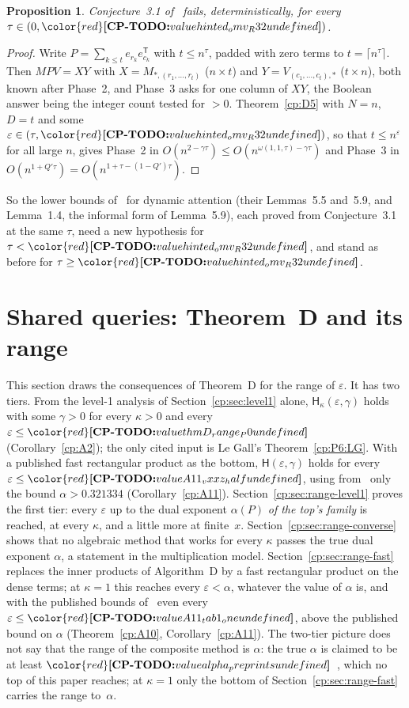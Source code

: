 \documentclass[11pt]{article}
\makeatletter
\newtheorem{proposition}[theorem]{Proposition}
\theoremstyle{definition}
\theoremstyle{remark}
\DeclareRobustCommand{\CPTODO}[1]{{\color{red}\textbf{[CP-TODO:} #1\textbf{]}}}
\providecommand{\eps}{\varepsilon}
\newcommand{\Hyp}{\mathsf{H}}                 %
\newcommand{\Hypk}[1]{\mathsf{H}_{#1}}        %
\newcommand{\ThmD}{Theorem~D}                               %
\newcommand{\AlgD}{Algorithm~D}                             %
\newcommand{\cpv}[1]{\ifcsname cpv@#1\endcsname\csname cpv@#1\endcsname\else\CPTODO{value #1 undefined}\fi}
\newcommand{\AlphaVXXZ}{0.321334}%
\makeatother
\begin{document}
\begin{proposition}\label{cp:D:BSZ}
Conjecture~3.1 of~\cite{BSZ24} fails, deterministically, for every $\tau\in(0,\cpv{hinted_omv_R32})$.
\end{proposition}

\begin{proof}
Write $P=\sum_{k\le t}e_{r_k}e_{c_k}^{\mathsf T}$ with $t\le n^\tau$, padded with zero terms to $t=\lceil n^\tau\rceil$. Then $MPV=XY$ with $X=M_{*,(r_1,\dots,r_t)}$ ($n\times t$) and $Y=V_{(c_1,\dots,c_t),*}$ ($t\times n$), both known after Phase~2, and Phase~3 asks for one column of $XY$, the Boolean answer being the integer count tested for $>0$. Theorem~\ref{cp:D5} with $N=n$, $D=t$ and some $\eps\in(\tau,\cpv{hinted_omv_R32})$, so that $t\le n^\eps$ for all large $n$, gives Phase~2 in $O(n^{2-\gamma\tau})\le O(n^{\omega(1,1,\tau)-\gamma\tau})$ and Phase~3 in $O(n^{1+Q'\tau})=O(n^{1+\tau-(1-Q')\tau})$.
\end{proof}

So the lower bounds of~\cite{BSZ24} for dynamic attention (their Lemmas~5.5 and~5.9, and Lemma~1.4, the informal form of Lemma~5.9), each proved from Conjecture~3.1 at the same $\tau$, need a new hypothesis for $\tau<\cpv{hinted_omv_R32}$, and stand as before for $\tau\ge\cpv{hinted_omv_R32}$.

\section{Shared queries: \texorpdfstring{\ThmD}{Theorem D} and its range}\label{cp:sec:range}

This section draws the consequences of \ThmD{} for the range of $\eps$. It has two tiers.
From the level-1 analysis of Section~\ref{cp:sec:level1} alone, $\Hypk\kappa(\eps,\gamma)$ holds with some $\gamma>0$ for every $\kappa>0$ and every $\eps\le\cpv{thmD_range_P0}$ (Corollary~\ref{cp:A2}); the only cited input is Le Gall's Theorem~\ref{cp:P6:LG}. With a published fast rectangular product as the bottom, $\Hyp(\eps,\gamma)$ holds for every $\eps\le\cpv{A11_vxxz_half}$, using from~\cite{VXXZ24} only the bound $\alpha>\AlphaVXXZ$ (Corollary~\ref{cp:A11}).
Section~\ref{cp:sec:range-level1} proves the first tier: every $\eps$ up to the dual exponent $\alpha(P)$ \emph{of the top's family} is reached, at every $\kappa$, and a little more at finite~$x$. Section~\ref{cp:sec:range-converse} shows that no algebraic method that works for every $\kappa$ passes the true dual exponent $\alpha$, a statement in the multiplication model. Section~\ref{cp:sec:range-fast} replaces the inner products of \AlgD{} by a fast rectangular product on the dense terms; at $\kappa=1$ this reaches every $\eps<\alpha$, whatever the value of $\alpha$ is, and with the published bounds of~\cite{VXXZ24} even every $\eps\le\cpv{A11_tab1_one}$, above the published bound on $\alpha$ (Theorem~\ref{cp:A10}, Corollary~\ref{cp:A11}). The two-tier picture does not say that the range of the composite method is $\alpha$: the true $\alpha$ is claimed to be at least $\cpv{alpha_preprints}$~\cite{AvdBZ26,Uzn26}, which no top of this paper reaches; at $\kappa=1$ only the bottom of Section~\ref{cp:sec:range-fast} carries the range to~$\alpha$.
\end{document}
